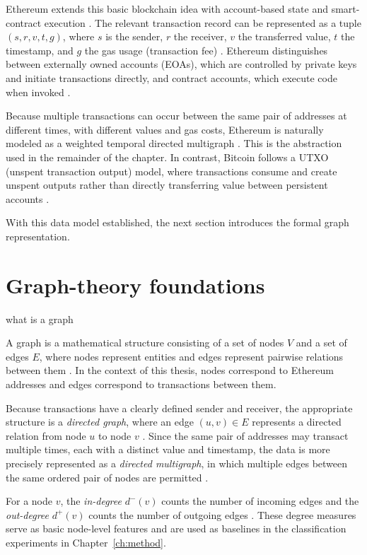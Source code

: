 \documentclass{thesisclass}
\begin{document}
Ethereum extends this basic blockchain idea with account-based state and smart-contract execution \cite{buterin2014ethereum}. The relevant transaction record can be represented as a tuple $(s,r,v,t,g)$, where $s$ is the sender, $r$ the receiver, $v$ the transferred value, $t$ the timestamp, and $g$ the gas usage (transaction fee) \cite{alemari2021labeled, sanjalawe2023atd}. Ethereum distinguishes between externally owned accounts (EOAs), which are controlled by private keys and initiate transactions directly, and contract accounts, which execute code when invoked \cite{buterin2014ethereum, alemari2021labeled}.

Because multiple transactions can occur between the same pair of addresses at different times, with different values and gas costs, Ethereum is naturally modeled as a weighted temporal directed multigraph \cite{kovanen2011temporal, paranjape2017motifs}. This is the abstraction used in the remainder of the chapter. In contrast, Bitcoin follows a UTXO (unspent transaction output) model, where transactions consume and create unspent outputs rather than directly transferring value between persistent accounts \cite{nakamoto2008bitcoin}.

With this data model established, the next section introduces the formal graph representation.

\section{Graph-theory foundations}
\label{sec:graph}
what is a graph

A graph is a mathematical structure consisting of a set of nodes $V$ and a set 
of edges $E$, where nodes represent entities and edges represent pairwise 
relations between them \cite{newman2010networks}. In the context of this 
thesis, nodes correspond to Ethereum addresses and edges correspond to 
transactions between them.

Because transactions have a clearly defined sender and receiver, the 
appropriate structure is a \emph{directed graph}, where an edge $(u, v) \in E$ 
represents a directed relation from node $u$ to node $v$ 
\cite{newman2010networks}. Since the same pair of addresses may transact 
multiple times, each with a distinct value and timestamp, the data is more 
precisely represented as a \emph{directed multigraph}, in which multiple edges 
between the same ordered pair of nodes are permitted 
\cite{paranjape2017motifs, sanjalawe2023atd}.

For a node $v$, the \emph{in-degree} $d^-(v)$ counts the number of incoming 
edges and the \emph{out-degree} $d^+(v)$ counts the number of outgoing edges 
\cite{newman2010networks}. These degree measures serve as basic node-level 
features and are used as baselines in the classification experiments in 
Chapter~\ref{ch:method}.
\end{document}
